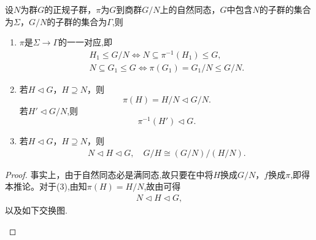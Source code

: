 \documentclass[../../main.tex]{subfiles}%
\begin{document}
\begin{corollary}\label{corollary:群同态第二定理推论}
设$N$为群$G$的正规子群，$\pi$为$G$到商群$G/N$上的自然同态，$G$中包含$N$的子群的集合为$\Sigma$，$G/N$的子群的集合为$\Gamma$,则
\begin{enumerate}[(1)]
\item\label{corollary:群同态第二定理推论-1} $\pi$是$\Sigma \to \Gamma$的一一对应,即
\begin{gather*}
H_1\leqslant G/N\iff N\subseteq \pi^{-1}(H_1) \leqslant G,
\\
N\subseteq G_1\leqslant G \iff \pi(G_1) = G_1/N \leqslant G/N.
\end{gather*}

\item\label{corollary:群同态第二定理推论-2} 若$H \lhd G$，$H \supseteq N$，则$$
\pi(H)=H/N\lhd G/N.
$$
若$H' \lhd G/N$,则
$$
\pi^{-1}(H')\lhd G.
$$

\item\label{corollary:群同态第二定理推论-3} 若$H \lhd G$，$H \supseteq N$，则
\begin{align*}
N\lhd H\lhd G,\quad G/H \cong (G/N)/(H/N). 
\end{align*}
\end{enumerate}
\end{corollary}
\begin{proof}
事实上，由于自然同态必是满同态,故只要在中将$H$换成$G/N$，$f$换成$\pi$,即得本推论。对于(3),由知$\pi (H)=H/N$,故由可得
\begin{align*}
N\lhd H\lhd G,
\end{align*}
以及如下交换图.
\begin{figure}[H]
\centering
{}
\caption{}
\label{figure:抽象代数--图1.7.gq34gaewe2}
\end{figure}\end{proof}
\end{document}
